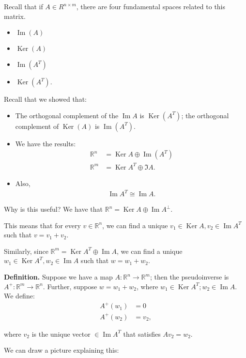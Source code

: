\documentclass{article}
\newcommand{\RR}{\mathbb{R}}
\DeclareMathOperator{\Ker}{Ker}
\DeclareMathOperator{\Ima}{Im}
\DeclareMathOperator{\Ima}{Im}
\begin{document}
Recall that if $A \in R^{n \times m}$, there are four fundamental spaces related to this matrix.

\begin{itemize}
  \item $\Ima (A)$
  \item $\Ker (A)$
  \item $\Ima (A^T)$
  \item $\Ker(A^T)$.
\end{itemize}

Recall that we showed that:

\begin{itemize}
  \item The orthogonal complement of the $\Ima A$ is $\Ker (A^T)$; the orthogonal complement of $\Ker(A)$ is $\Ima(A^T)$.
  \item We have the results:
    \begin{align*}
      \RR^n &= \Ker A \oplus \Ima (A^T) \\
      \RR^m &= \Ker A^T \oplus \Im A.
    \end{align*}
  \item Also,
    \begin{align*}
      \Ima A^T \cong \Ima A.
    \end{align*}
\end{itemize}

Why is this useful?  We have that $\RR^n = \Ker A \oplus \Ima A^{\perp}$.

This means that for every $v \in \RR^n$, we can find a unique $v_1 \in \Ker A, v_2 \in \Ima A^T$ such that $v = v_1 + v_2$.

Similarly, since $\RR^m = \Ker A^T \oplus \Ima A$, we can find a unique $w_1 \in \Ker A^T, w_2 \in \Ima A$ such that $w = w_1 + w_2$.

{\bf Definition.} Suppose we have a map $A: \RR^n \to \RR^m$; then the pseudoinverse is $A^{+} : \RR^m \to \RR^n$. Further, suppose $w = w_1 + w_2$, where $w_1 \in \Ker A^T; w_2 \in \Ima A$.  We define:
\begin{align*}
  A^{+}(w_1) &= 0 \\
  A^{+}(w_2) &= v_2,
\end{align*}

where $v_2$ is the unique vector $\in \Ima A^T$ that satisfies $A v_2 = w_2$.

We can draw a picture explaining this:

\end{document}
